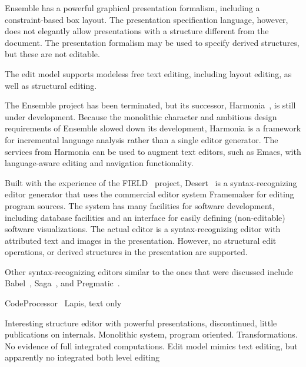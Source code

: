 \documentclass{speauth}
\begin{document}
Ensemble has a powerful graphical presentation formalism, including a constraint-based box layout. The presentation specification language, however, does not elegantly allow presentations with a structure different from the document. The presentation formalism may be used to specify derived structures, but these are not editable.

The edit model supports modeless free text editing, including layout editing, as well as structural editing.

The Ensemble project has been terminated, but its successor, Harmonia~\cite{boshernitsan01harmonia}, is still under development. Because the monolithic character and ambitious design requirements of Ensemble slowed down its development, Harmonia is a framework for incremental language analysis rather than a single editor generator. The services from Harmonia can be used to augment text editors, such as Emacs, with language-aware editing and navigation functionality.


Built with the experience of the FIELD~\cite{reiss94field} project, Desert~\cite{reiss99desert} is a syntax-recognizing editor generator that uses the commercial editor system Framemaker for editing program sources. The system has many facilities for software development, including database facilities and an interface for easily defining (non-editable) software visualizations. The actual editor is a syntax-recognizing editor with attributed text and images in the presentation. However, no structural edit operations, or derived structures in the presentation are supported.


Other syntax-recognizing editors similar to the ones that were discussed include  Babel~\cite{horton81babel}, Saga~\cite{campbell84saga}, and Pregmatic~\cite{brand92pregmatic}.


\bc
CodeProcessor~\cite{codeprocessor}
Lapis, text only

Interesting structure editor with powerful presentations, discontinued, little publications on
internals. Monolithic system, program oriented. Transformations. No evidence of full 
integrated computations. Edit model mimics text editing, but apparently no integrated
both level editing
\ec
\end{document}
